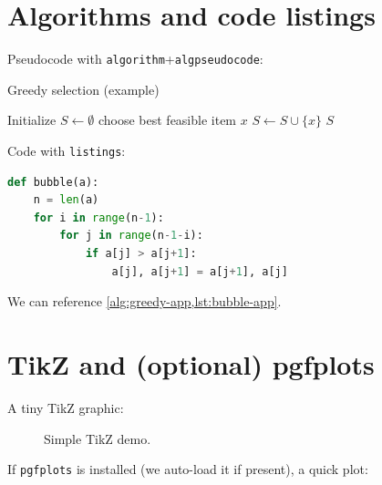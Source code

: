 \section{Algorithms and code listings}
Pseudocode with \texttt{algorithm}+\texttt{algpseudocode}:
\begin{algorithm}[h]
\caption{Greedy selection (example)}
\begin{algorithmic}[1]
  \State Initialize $S \gets \emptyset$
    \State choose best feasible item $x$
    \State $S \gets S \cup \{x\}$
  \EndWhile
  \State \Return $S$
\end{algorithmic}
\label{alg:greedy-app}
\end{algorithm}

Code with \texttt{listings}:
{\captionsetup{type=lstlisting}
\begin{lstlisting}[language=Python,caption={Bubble sort},label={lst:bubble-app}]
def bubble(a):
    n = len(a)
    for i in range(n-1):
        for j in range(n-1-i):
            if a[j] > a[j+1]:
                a[j], a[j+1] = a[j+1], a[j]
\end{lstlisting}
}



We can reference \cref{alg:greedy-app,lst:bubble-app}.

\section{TikZ and (optional) pgfplots}
A tiny TikZ graphic:
\begin{figure}[h]
  \centering
  \caption{Simple TikZ demo.}
\end{figure}

If \texttt{pgfplots} is installed (we auto-load it if present), a quick plot:

